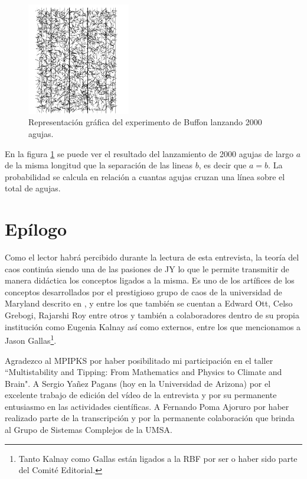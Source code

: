 \documentclass{rbf}
\begin{document}
\begin{figure}[tbp!]
 \centering
  \includegraphics[width=0.4\textwidth]{figures/buffon.jpg}
	\caption{Representación gráfica del experimento de Buffon lanzando 2000 agujas.\cite{Statistics}}
 \label{buff}
\end{figure}


En la figura \ref{buff} se puede ver el resultado del lanzamiento de 2000 agujas de largo $a$ de la misma longitud que la separación de las lineas $b$, es decir que $a=b$. La probabilidad se calcula en relación a cuantas agujas cruzan una línea sobre el total de agujas. 



\section{Epílogo}\label{epi}
Como el lector habrá percibido durante la lectura de esta entrevista, la teoría del caos continúa siendo una de las pasiones de JY lo que le permite transmitir de manera didáctica los conceptos ligados a la misma. Es uno de los artífices de los conceptos desarrollados por el prestigioso grupo de caos de la universidad de Maryland descrito en \cite{UMD17}, y entre los que también se cuentan a Edward Ott, Celso Grebogi, Rajarshi Roy entre otros y también a colaboradores dentro de su propia institución como Eugenia Kalnay así como externos, entre los que mencionamos a Jason Gallas\footnote{Tanto Kalnay como Gallas están ligados a la RBF por ser o haber sido parte del Comité Editorial.}.

\begin{acknowledgments}
Agradezco al MPIPKS por haber posibilitado mi participación en el taller ``Multistability and Tipping: From Mathematics and Physics to Climate and Brain". A Sergio Yañez Pagans (hoy en la Universidad de Arizona) por el excelente trabajo de edición del vídeo de la entrevista y por su permanente entusiasmo en las actividades científicas. A Fernando Poma Ajoruro por haber realizado parte de la transcripción y por la permanente colaboración que brinda al Grupo de Sistemas Complejos de la UMSA.
\end{acknowledgments}







\end{document}
